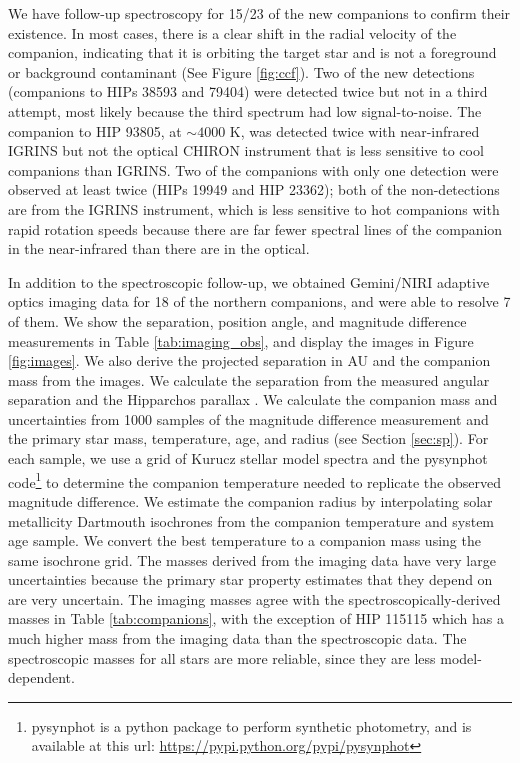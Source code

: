 \documentclass{emulateapj}
\begin{document}
We have follow-up spectroscopy for 15/23 of the new companions to confirm their existence. In most cases, there is a clear shift in the radial velocity of the companion, indicating that it is orbiting the target star and is not a foreground or background contaminant (See Figure \ref{fig:ccf}). Two of the new detections (companions to HIPs 38593 and 79404) were detected twice but not in a third attempt, most likely because the third spectrum had low signal-to-noise. The companion to HIP 93805, at $\sim 4000$ K, was detected twice with near-infrared IGRINS but not the optical CHIRON instrument that is less sensitive to cool companions than IGRINS. Two of the companions with only one detection were observed at least twice (HIPs 19949 and HIP 23362); both of the non-detections are from the IGRINS instrument, which is less sensitive to hot companions with rapid rotation speeds because there are far fewer spectral lines of the companion in the near-infrared than there are in the optical.


In addition to the spectroscopic follow-up, we obtained Gemini/NIRI adaptive optics imaging data for 18 of the northern companions, and were able to resolve 7 of them. We show the separation, position angle, and magnitude difference measurements in Table \ref{tab:imaging_obs}, and display the images in Figure \ref{fig:images}. We also derive the projected separation in AU and the companion mass from the images. We calculate the separation from the measured angular separation and the Hipparchos parallax \citep{Hipparchos}. We calculate the companion mass and uncertainties from 1000 samples of the magnitude difference measurement and the primary star mass, temperature, age, and radius (see Section \ref{sec:sp}). For each sample, we use a grid of Kurucz stellar model spectra \citep{Castelli2003}and the pysynphot code\footnote{pysynphot is a python package to perform synthetic photometry, and is available at this url: \url{https://pypi.python.org/pypi/pysynphot}} to determine the companion temperature needed to replicate the observed magnitude difference. We estimate the companion radius by interpolating solar metallicity Dartmouth isochrones \citep{Dotter2008} from the companion temperature and system age sample. We convert the best temperature to a companion mass using the same isochrone grid. The masses derived from the imaging data have very large uncertainties because the primary star property estimates that they depend on are very uncertain. The imaging masses agree with the spectroscopically-derived masses in Table \ref{tab:companions}, with the exception of HIP 115115 which has a much higher mass from the imaging data than the spectroscopic data. The spectroscopic masses for all stars are more reliable, since they are less model-dependent.
\end{document}
